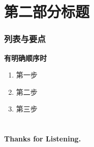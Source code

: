 \documentclass[10pt,aspectratio=43,mathserif]{beamer}
\begin{document}
\section[第二部分]{第二部分标题}

\begin{frame}
    \frametitle{\textbf{列表与要点}}
    \begin{block}{\textbf{有明确顺序时}}
        \begin{enumerate}
            \item 第一步
            \item 第二步
            \item 第三步
        \end{enumerate}
    \end{block}
\end{frame}

\section*{}
\begin{frame}
    \centering
    \LARGE\textbf{\quad Thanks for Listening.}
\end{frame}
\end{document}
